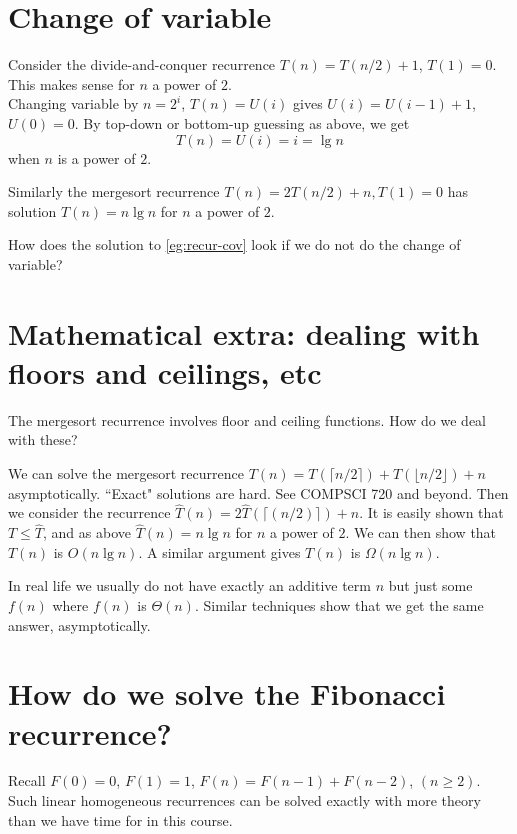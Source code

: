 \section{Change of variable}
\begin{Boxample} \label{eg:recur-cov}
Consider the divide-and-conquer recurrence $T(n) = T(n/2) + 1$, $T(1) = 0$. 
This makes sense for $n$ a power of $2$.\\

Changing variable by $n = 2^i$, $T(n) = U(i)$ 
gives $U(i) = U(i-1) + 1$, $U(0) = 0$. 
By top-down or bottom-up guessing as above, we get 
$$T(n) = U(i) =  i = \lg n$$ when $n$ is a power of $2$.

Similarly the mergesort recurrence $T(n) = 2T(n/2) + n, T(1)  = 0$ 
has solution $T(n) = n \lg n$ for $n$ a power of $2$.
\end{Boxample}

\begin{Boxample}[6]
How does the solution to \cref{eg:recur-cov} look if we do not do the change of variable?
\end{Boxample}

\section{Mathematical extra: dealing with floors and ceilings, etc}
The mergesort recurrence involves floor and ceiling functions. How do we deal with these?

We can solve the mergesort recurrence $T(n) = T(\lceil n/2 \rceil) + T(\lfloor n/2 \rfloor) + n$ asymptotically. 
``Exact" solutions are hard. See COMPSCI 720 and beyond. Then we consider the recurrence $\hat{T}(n) =
2\hat{T}(\lceil(n/2)\rceil) + n$. It is easily shown that $T \leq \hat{T}$, and 
as above $\hat{T}(n) = n \lg n$ for $n$ a power of $2$. We can then show that $T(n)$ is $O(n \lg n)$. A similar argument gives $T(n)$ is $\Omega(n \lg n)$.

In real life we usually do not have exactly an additive term $n$
but just some $f(n)$ where $f(n)$ is $\Theta(n)$. Similar techniques show that 
we get the same answer, asymptotically. 


\section{How do we solve the Fibonacci recurrence?}
Recall $F(0) = 0$, $F(1) = 1$, $F(n) = F(n-1) + F(n-2)$,  $(n \geq 2)$.
Such linear homogeneous recurrences can be solved exactly with
more theory than we have time for in this course. 

